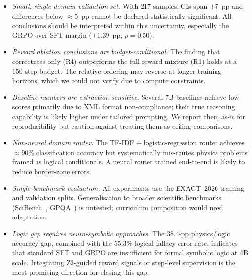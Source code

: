 \documentclass{ieeeaccess}
\newcommand{\dataset}{EXACT~2026}
\begin{document}
\begin{itemize}
  \item \emph{Small, single-domain validation set.}
        With 217 samples, CIs span $\pm$7~pp and differences below
        $\approx$5~pp cannot be declared statistically significant.
        All conclusions should be interpreted within this uncertainty,
        especially the GRPO-over-SFT margin ($+1.39$~pp, $p=0.50$).

  \item \emph{Reward ablation conclusions are budget-conditional.}
        The finding that correctness-only (R4) outperforms the full
        reward mixture (R1) holds at a 150-step budget.
        The relative ordering may reverse at longer training horizons,
        which we could not verify due to compute constraints.

  \item \emph{Baseline numbers are extraction-sensitive.}
        Several 7B baselines achieve low scores primarily due to XML
        format non-compliance; their true reasoning capability is
        likely higher under tailored prompting.
        We report them as-is for reproducibility but caution against
        treating them as ceiling comparisons.

  \item \emph{Non-neural domain router.}
        The TF-IDF + logistic-regression router achieves $\approx$90\%
        classification accuracy but systematically mis-routes physics
        problems framed as logical conditionals.
        A neural router trained end-to-end is likely to reduce
        border-zone errors.

  \item \emph{Single-benchmark evaluation.}
        All experiments use the \dataset{} training and validation splits.
        Generalisation to broader scientific benchmarks
        (SciBench~\cite{Wang2024scibench}, GPQA~\cite{Rein2023}) is
        untested; curriculum composition would need adaptation.

  \item \emph{Logic gap requires neuro-symbolic approaches.}
        The 38.4-pp physics/logic accuracy gap, combined with the
        55.3\% logical-fallacy error rate, indicates that standard SFT
        and GRPO are insufficient for formal symbolic logic at 4B scale.
        Integrating Z3-guided reward signals or step-level supervision
        is the most promising direction for closing this gap.
\end{itemize}
\end{document}
